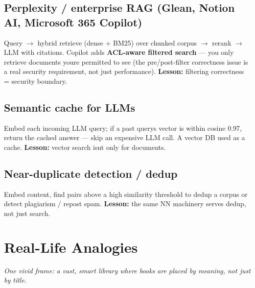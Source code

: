 \documentclass[11pt]{article}
\begin{document}
\subsection{Perplexity / enterprise RAG (Glean, Notion AI, Microsoft 365 Copilot)}\label{perplexity--enterprise-rag-glean-notion-ai-microsoft-365-copilot}

Query \(\rightarrow\) hybrid retrieve (dense + BM25) over chunked corpus \(\rightarrow\) rerank \(\rightarrow\) LLM with citations. Copilot adds \textbf{ACL-aware filtered search} --- you only retrieve documents you\textquotesingle re permitted to see (the pre/post-filter correctness issue is a real security requirement, not just performance). \textbf{Lesson:} filtering correctness = security boundary.

\subsection{Semantic cache for LLMs}\label{semantic-cache-for-llms}

Embed each incoming LLM query; if a past query\textquotesingle s vector is within cosine 0.97, return the cached answer --- skip an expensive LLM call. A vector DB used as a cache. \textbf{Lesson:} vector search isn\textquotesingle t only for documents.

\subsection{Near-duplicate detection / dedup}\label{near-duplicate-detection--dedup}

Embed content, find pairs above a high similarity threshold to dedup a corpus or detect plagiarism / repost spam. \textbf{Lesson:} the same NN machinery serves dedup, not just search.

\section{Real-Life Analogies}\label{real-life-analogies}

\emph{One vivid frame: a vast, smart library where books are placed by meaning, not just by title.}
\end{document}
